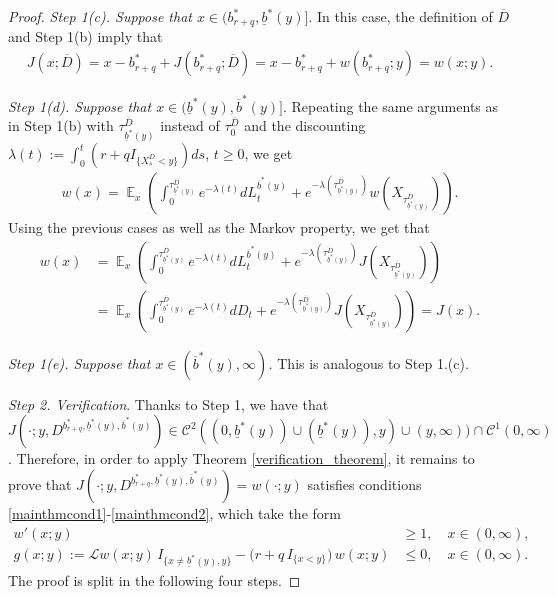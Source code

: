 \documentclass[11pt]{article} %
\DeclareMathOperator{\E}{\mathbb E}
\newcommand{\ubar}[1]{\underaccent{\bar}{#1}}
\numberwithin{komcounter}{section}
\renewcommand{\ubar}{\underline}
\renewcommand{\bar}{\overline}
\numberwithin{equation}{section}
\numberwithin{theorem}{section}
\begin{document}
\begin{proof}
\vspace{1mm}
{\it Step 1(c). Suppose that $x\in (b_{r+q}^*,\ubar{b}^*(y)]$}. 
In this case, the definition of $\bar D$ and Step 1(b) imply that
\begin{align*}
J(x;\bar D) 
= x -b_{r+q}^* + J(b_{r+q}^*;\bar D) 
= x -b_{r+q}^* + w(b_{r+q}^*;y) 
= w(x;y).
\end{align*}

\vspace{1mm}
{\it Step 1(d). Suppose that $x\in (\ubar{b}^*(y),\bar{b}^*(y)]$}. 
Repeating the same arguments as in Step 1(b) with $\tau_{\ubar{b}^*(y)}^{\bar D}$ instead of $\tau_0^{\bar D}$ and the discounting $\lambda(t):=\int_0^{t} (r + qI_{\{X^D_s<y\}}) ds$, $t \geq 0$, we get 
\begin{align}
w(x)=\E_x\left(\int_0^{\tau_{\ubar{b}^*(y)}^{\bar D}} e^{-\lambda(t)}dL_t^{\bar{b}^*(y)}+ e^{-\lambda(\tau_{\ubar{b}^*(y)}^{\bar D})}w(X_{\tau_{\ubar{b}^*(y)}^{\bar D}})\right).
\end{align}
Using the previous cases as well as the Markov property, we get that
\begin{align*}
    w(x)&=\E_x\left(\int_0^{\tau_{\ubar{b}^*(y)}^{\bar D}}e^{-\lambda(t)}dL_t^{\bar{b}^*(y)}+e^{-\lambda(\tau_{\ubar{b}^*(y)}^{\bar D})}J(X_{\tau_{\ubar{b}^*(y)}^{\bar D}})\right)\\
    &=\E_x\left(\int_0^{\tau_{\ubar{b}^*(y)}^{\bar D}}e^{-\lambda(t)}dD_t+e^{-\lambda(\tau_{\ubar{b}^*(y)}^{\bar D})}J(X_{\tau_{\ubar{b}^*(y)}^{\bar D}})\right)=J(x).
\end{align*}

\vspace{1mm}
{\it Step 1(e). Suppose that $x\in (\bar{b}^*(y),\infty)$.} 
This is analogous to Step 1.(c). 

\vspace{1mm}
{\it Step 2. Verification}.
Thanks to Step 1, we have that $J(\cdot;y,D^{b_{r+q}^*,\ubar{b}^*(y),\bar{b}^*(y)}) \in \mathcal{C}^2((0,\ubar{b}^*(y)) \cup (\ubar{b}^*(y)),y) \cup (y,\infty)) \cap \mathcal{C}^1(0,\infty)$.
Therefore, in order to apply Theorem \ref{verification_theorem}, it remains to prove that $J(\cdot;y,D^{b_{r+q}^*,\ubar{b}^*(y),\bar{b}^*(y)}) = w(\cdot;y)$ satisfies conditions \eqref{mainthmcond1}-\eqref{mainthmcond2}, which take the form
\begin{align}
w'(x;y) &\geq 1, \quad x\in (0,\infty), \label{mainthmcond1cr}  \tag{I'} \\
g(x;y) := \mathcal{L} w(x;y) \, I_{\{x\not=\ubar{b}^*(y),y\}} -\big(r + q \, I_{\{x<y\}} \big) \, w(x;y) &\leq 0, \quad x\in (0,\infty). \label{mainthmcond2cr}  \tag{II'} 
\end{align}
The proof is split in the following four steps.


\end{proof}
\end{document}
